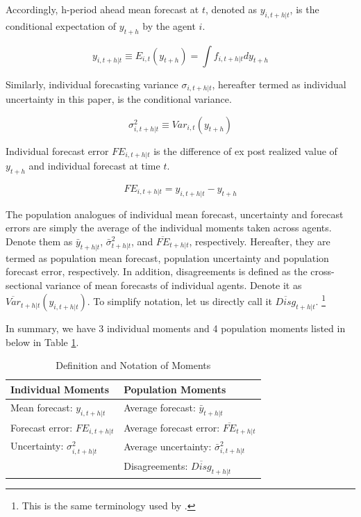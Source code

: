\documentclass[]{article}
\begin{document}
	Accordingly, h-period ahead mean forecast at $t$, denoted as $ y_{i,t+h|t}$, is the conditional expectation of $y_{t+h}$ by the agent $i$. 
	
	$$y_{i,t+h|t} \equiv E_{i,t}(y_{t+h}) =\int f_{i, t+h|t} d y_{t+h}$$
	
	Similarly, individual forecasting variance $\sigma_{i,t+h|t}$, hereafter termed as individual uncertainty in this paper, is the conditional variance.
	
	$$\sigma^2_{i,t+h|t} \equiv Var_{i,t}( y_{t+h} )$$
	
	Individual forecast error $FE_{i,t+h|t}$ is the difference of ex post realized value of $y_{t+h}$ and individual forecast at time $t$. 
	
	$$FE_{i,t+h|t} = y_{i,t+h|t} - y_{t+h}$$
	
	The population analogues of individual mean forecast, uncertainty and forecast errors are simply the average of the individual moments taken across agents. Denote them as $\bar y_{t+h|t}$, $\bar \sigma^2_{t+h|t}$, and $\overline{FE}_{t+h|t}$, respectively. Hereafter, they are termed as population mean forecast, population uncertainty and population forecast error, respectively. In addition, disagreements is defined as the cross-sectional variance of mean forecasts of individual agents.  Denote it as $\overline{Var}_{t+h|t}(y_{i,t+h|t}) $. To simplify notation, let us directly call it $\overline{Disg}_{t+h|t}$.  \footnote{This is the same terminology used by \citet{xx}.}
	
	In summary, we have 3 individual moments and 4 population moments listed in below in Table \ref{MomSum}.
	
	\begin{table}[]
		\centering
		\caption{Definition and Notation of Moments}
		\label{MomSum}
		\begin{tabular}{ll}
			
			\hline 
			Individual Moments                                  & Population Moments                             \\
			\hline 
			Mean forecast: $y_{i,t+h|t}$                   & Average forecast: $\bar y_{t+h|t}$                   \\
			Forecast error: $FE_{i,t+h|t}$ & Average forecast error: $\overline{FE}_{t+h|t}$ \\
			Uncertainty: $\sigma^2_{i,t+h|t}$         & Average uncertainty:  $\bar \sigma^2_{i,t+h|t}$ \\
			& Disagreements:  $\overline{Disg}_{t+h|t}$       \\
			\hline 
		\end{tabular}
	\end{table}
	
\end{document}
